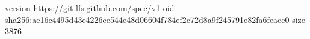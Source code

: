 version https://git-lfs.github.com/spec/v1
oid sha256:ae16c4495d43e4226ee544e48d06604f784ef2c72d8a9f245791e82fa6feace0
size 3876
